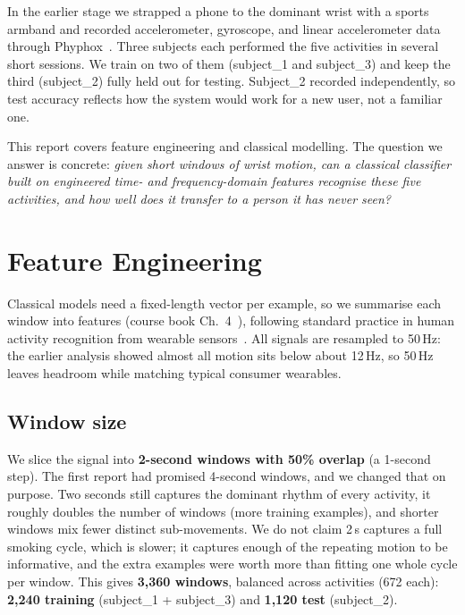 \documentclass[runningheads]{llncs}
\begin{document}
In the earlier stage we strapped a phone to the dominant wrist with a sports armband and recorded accelerometer, gyroscope, and linear accelerometer data through Phyphox~\cite{phyphox2019}. Three subjects each performed the five activities in several short sessions. We train on two of them (subject\_1 and subject\_3) and keep the third (subject\_2) fully held out for testing. Subject\_2 recorded independently, so test accuracy reflects how the system would work for a new user, not a familiar one.

This report covers feature engineering and classical modelling. The question we answer is concrete: \emph{given short windows of wrist motion, can a classical classifier built on engineered time- and frequency-domain features recognise these five activities, and how well does it transfer to a person it has never seen?}


\section{Feature Engineering}
\label{sec:features}

Classical models need a fixed-length vector per example, so we summarise each window into features (course book Ch.~4~\cite{hoogendoorn2018}), following standard practice in human activity recognition from wearable sensors~\cite{lara2013}. All signals are resampled to 50\,Hz: the earlier analysis showed almost all motion sits below about 12\,Hz, so 50\,Hz leaves headroom while matching typical consumer wearables.

\subsection{Window size}
We slice the signal into \textbf{2-second windows with 50\% overlap} (a 1-second step). The first report had promised 4-second windows, and we changed that on purpose. Two seconds still captures the dominant rhythm of every activity, it roughly doubles the number of windows (more training examples), and shorter windows mix fewer distinct sub-movements. We do not claim 2\,s captures a full smoking cycle, which is slower; it captures enough of the repeating motion to be informative, and the extra examples were worth more than fitting one whole cycle per window. This gives \textbf{3{,}360 windows}, balanced across activities (672 each): \textbf{2{,}240 training} (subject\_1 + subject\_3) and \textbf{1{,}120 test} (subject\_2).
\end{document}
